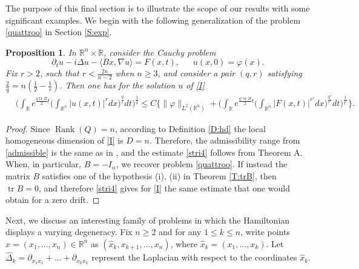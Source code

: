 \documentclass[11pt,letter]{amsart}
\def \R {\mathbb{R}}
\def \vf{\varphi}
\newcommand{\Rn}{\mathbb R^n}
\newcommand{\p}{\partial}
\numberwithin{equation}{section}
\newcommand{\tr}{\operatorname{tr}}
\newcommand{\sa}{\langle}
\newcommand{\da}{\rangle}
\newtheorem{proposition}[theorem]{Proposition}
\numberwithin{equation}{section}
\begin{document}
The purpose of this final section is to illustrate the scope of our results with some significant examples. We begin with the following generalization of the problem \eqref{quattroo} in Section \ref{S:exp}.

\begin{proposition}\label{E:inv}
In $\Rn\times \R$, consider the Cauchy problem
\begin{equation}\label{I}
\p_t u - i \Delta u -  \sa Bx,\nabla u\da   = F(x,t),\ \ \ \ \ \ \ u(x,0) = \vf(x).
\end{equation}
Fix $r>2$, such that $r<\frac{2n}{n-2}$ when $n\ge 3$, and consider a pair $(q,r)$ satisfying $\frac 2q = n\left(\frac 12 - \frac 1r\right)$. Then one has for the 
solution $u$ of \eqref{I}  
\begin{align}\label{stri4}
& \bigg(\int_\R e^{\frac{q\tr B}2 t}  \big(\int_{\Rn}|u(x,t)|^r dx\big)^{\frac qr} dt\bigg)^{\frac 1q} \le C \bigg\{\|\vf\|_{L^2(\Rn)}
 + \bigg(\int_\R e^{\frac{q'\tr B}2 t}  \big(\int_{\Rn}|F(x,t)|^{r'} dx\big)^{\frac{q'}{r'}} dt\bigg)^{\frac 1{q'}}\bigg\}.
\end{align}
\end{proposition}

\begin{proof}
Since $\operatorname{Rank}(Q) =n$, according to Definition \ref{D:hd} the local homogeneous dimension of \eqref{I} is $D = n$. Therefore, the admissibility range from \eqref{admissible} is the same as in \cite{GVstrich}, and the estimate \eqref{stri4} follows from Theorem A. When, in particular, $B = - I_n$, we recover problem \eqref{quattroo}.
If instead the matrix $B$ satisfies one of the hypothesis (i), (ii) in Theorem \ref{T:trB}, then $\tr B = 0$, and therefore \eqref{stri4} gives for \eqref{I} the same estimate that one would obtain for a zero drift.

\end{proof}


\medskip


Next, we discuss an interesting family of problems in which the Hamiltonian displays a varying degeneracy. Fix $n\ge 2$ and for any $1\le k \le n$, write points $x = (x_1,...,x_n)\in \Rn$ as $(\hat x_k,x_{k+1},...,x_n)$, where $\hat x_k = (x_1,...,x_k)$. Let $\hat \Delta_{k} = \p_{x_1x_1} + ... + \p_{x_k x_k}$ represent the Laplacian with respect to the coordinates $\hat x_k$. 
 
\end{document}
